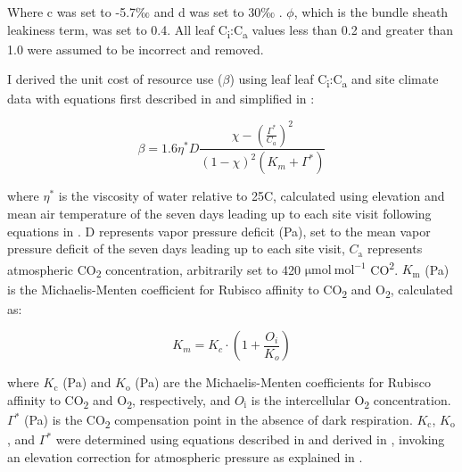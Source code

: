 \noindent Where c was set to -5.7‰ and d was set to 30‰ . $\phi$, which is the bundle sheath leakiness term, was set to 0.4. All leaf C\textsubscript{i}:C\textsubscript{a} values less than 0.2 and greater than 1.0 were assumed to be incorrect and removed.
    
I derived the unit cost of resource use ($\beta$) using leaf leaf C\textsubscript{i}:C\textsubscript{a} and site climate data with equations first described in  and simplified in :

\begin{equation}
    \label{eq_4.5}
    \beta = 1.6\eta^{*} D \frac{\chi - (\frac{\Gamma^*}{C_{a}})^{2}}{(1 - \chi)^{2}(K_{m} + \Gamma^{*})}
\end{equation}
    
\noindent where $\eta^{*}$ is the viscosity of water relative to 25\textdegree{}C, calculated using elevation and mean air temperature of the seven days leading up to each site visit following equations in . D represents vapor pressure deficit (Pa), set to the mean vapor pressure deficit of the seven days leading up to each site visit, $C_\mathrm{a}$ represents atmospheric CO\textsubscript{2} concentration, arbitrarily set to 420 $\mathrm{\mu mol\ mol^{-1}}$ CO\textsuperscript{2}. $K_\mathrm{m}$ (Pa) is the Michaelis-Menten coefficient for Rubisco affinity to CO\textsubscript{2} and O\textsubscript{2}, calculated as:
    
\begin{equation} \label{eq_4.6}
    K_{m} = K_{c} \cdot \left ( 1 + \frac{O_i}{K_o} \right )
\end{equation}

\noindent where $K_\mathrm{c}$ (Pa) and $K_\mathrm{o}$ (Pa) are the Michaelis-Menten coefficients for Rubisco affinity to CO\textsubscript{2} and O\textsubscript{2}, respectively, and $O_\mathrm{i}$  is the intercellular O\textsubscript{2} concentration. $\Gamma^{*}$ (Pa) is the CO\textsubscript{2} compensation point in the absence of dark respiration. $K_\mathrm{c}$, $K_\mathrm{o}$, and $\Gamma^{*}$ were determined using equations described in  and derived in , invoking an elevation correction for atmospheric pressure as explained in .
\clearpage

